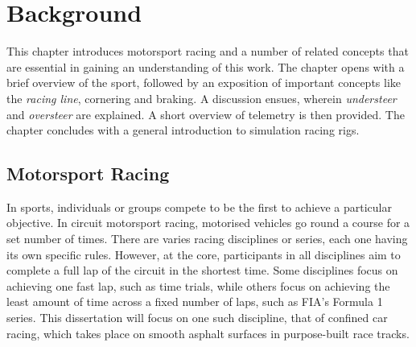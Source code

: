 \chapter{Background}
\label{sec:background}
\label{chp:background}

This chapter introduces motorsport racing and a number of related concepts that are essential in gaining an understanding of this work. The chapter opens with a brief overview of the sport, followed by an exposition of important concepts like the \emph{racing line}, cornering and braking. A discussion ensues, wherein \emph{understeer} and \emph{oversteer} are explained. A short overview of telemetry is then provided. The chapter concludes with a general introduction to simulation racing rigs.

\section{Motorsport Racing}
In sports, individuals or groups compete to be the first to achieve a particular objective. In circuit motorsport racing, motorised vehicles go round a course for a set number of times. There are varies racing disciplines or series, each one having its own specific rules. However, at the core, participants in all disciplines aim to complete a full lap of the circuit in the shortest time. Some disciplines focus on achieving one fast lap, such as time trials, while others focus on achieving the least amount of time across a fixed number of laps, such as FIA's Formula 1 series. This dissertation will focus on one such discipline, that of confined car racing, which takes place on smooth asphalt surfaces in purpose-built race tracks. 

